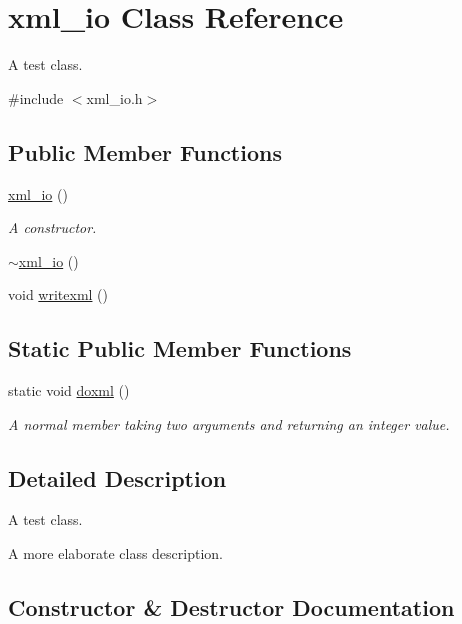 \hypertarget{classxml__io}{}\section{xml\+\_\+io Class Reference}
\label{classxml__io}


A test class.  




{\ttfamily \#include $<$xml\+\_\+io.\+h$>$}

\subsection*{Public Member Functions}
\begin{DoxyCompactItemize}
\item 
\mbox{\hyperlink{classxml__io_a7db2c035e4f744f9f8a5fe6543b7c5ec}{xml\+\_\+io}} ()
\begin{DoxyCompactList}\small\item\em A constructor. \end{DoxyCompactList}\item 
\mbox{\hyperlink{classxml__io_a01c56d514f2a24f0c7358526498c4a07}{$\sim$xml\+\_\+io}} ()
\item 
void \mbox{\hyperlink{classxml__io_a5daa3b87de561ed5147cc6c12b578eb3}{writexml}} ()
\end{DoxyCompactItemize}
\subsection*{Static Public Member Functions}
\begin{DoxyCompactItemize}
\item 
static void \mbox{\hyperlink{classxml__io_a3af0b8b55bb5146eaabab1d22c906040}{doxml}} ()
\begin{DoxyCompactList}\small\item\em A normal member taking two arguments and returning an integer value. \end{DoxyCompactList}\end{DoxyCompactItemize}


\subsection{Detailed Description}
A test class. 

A more elaborate class description. 

\subsection{Constructor \& Destructor Documentation}
\mbox{\label{classxml__io_a7db2c035e4f744f9f8a5fe6543b7c5ec}} 
